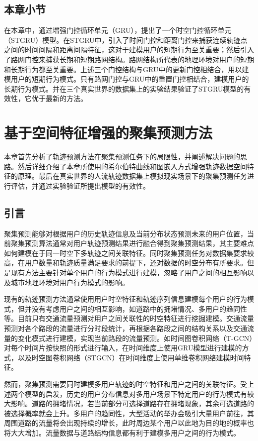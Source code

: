 \documentclass[master]{thesis-uestc}
\begin{document}
\section{本章小节}
在本章中，通过增强门控循环单元（GRU），提出了一个时空门控循环单元（STGRU）模型。在STGRU中，引入了时间门控和距离门控来捕获连续轨迹点之间的时间间隔和距离间隔特征，这对于建模用户的短期行为至关重要；然后引入了路网门控来捕获长期和短期路网结构。路网结构所代表的地理环境对用户的短期和长期行为都至关重要。上述三个门控结构与GRU中的更新门控相结合，用以建模用户的短期行为模式。只有路网门控与GRU中的重置门控相结合，建模用户的长期行为模式。并在三个真实世界的数据集上的实验结果验证了STGRU模型的有效性，它优于最新的方法。

\chapter{基于空间特征增强的聚集预测方法}
本章首先分析了轨迹预测方法在聚集预测任务下的局限性，并阐述解决问题的思路。然后详细介绍了本章所使用的希尔伯特曲线和图嵌入方式增强轨迹数据空间特征的原理。最后在真实世界的人流轨迹数据集上模拟现实场景下的聚集预测任务进行评估，并通过实验验证所提出模型的有效性。

\section{引言}
聚集预测能够对根据用户的历史轨迹信息及当前分布状态预测未来的用户位置，当前聚集预测算法通常对用户轨迹预测结果进行融合得到聚集预测结果，其主要难点如何建模在于同一时空下多轨迹之间关联特征。同时聚集预测任务对数据集要求较高，在用户数量和轨迹质量满足要求的前提下，还对数据的时空分布有所要求。但是现有方法主要针对单个用户的行为模式进行建模，忽略了用户之间的相互影响以及城市地理环境对用户行为模式的影响。

现有的轨迹预测方法通常使用用户时空特征和轨迹序列信息建模每个用户的行为模式，但并没有考虑用户之间的相互影响，如道路中的拥堵情况、多用户的趋同性等。目前只有交通流量预测对用户之间关联性的时空特征进行挖掘建模。交通流量预测对各个路段的流量进行分时段统计，再根据各路段之间的结构关系以及交通流量的变化模式进行建模，实现当前路段的流量预测。如时间图卷积网络（T-GCN）对每个时间片按快照的形式进行输入，在时间维度上使用GRU模型进行建模的方式，以及时空图卷积网络（STGCN）在时间维度上使用单维卷积网络建模时间特征。

然而，聚集预测需要同时建模多用户轨迹的时空特征和用户之间的关联特征。受上述两个模型的启发，历史的用户分布信息对多用户场景下特定用户的行为模式有较大影响。道路的拥堵情况，若当前部分可选择道路存在拥堵现象，其余可选道路的被选择概率就会上升。多用户的趋同性，大型活动的举办会吸引大量用户前往，其周围道路的流量将会出现持续的增长，此时周边某个用户以此地为目的地的概率也将大大增加。流量数据与道路结构信息都有利于建模多用户之间的行为模式。
\end{document}
